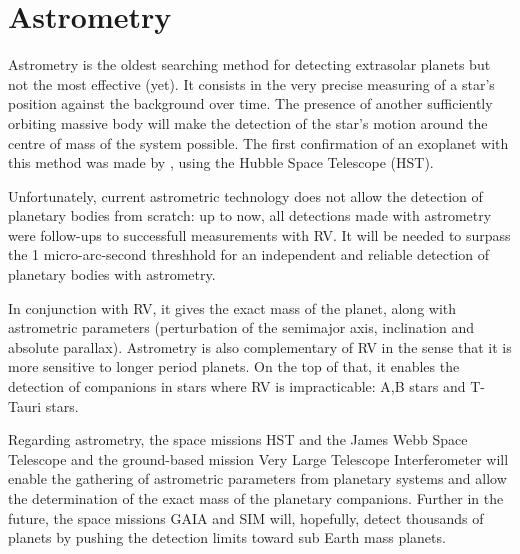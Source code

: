 \documentclass[dvips,12pt,a4paper]{report}
\begin{document}
\section{Astrometry}
\label{astrometry}
Astrometry is the oldest searching method for detecting extrasolar planets but not the most effective (yet). It consists in the very precise measuring of a star's position against the background over time. The presence of another sufficiently orbiting massive body will make the detection of the star's motion around the centre of mass of the system possible. The first confirmation of an exoplanet with this method was made by \citet{Benedict-2002}, using the Hubble Space Telescope (HST).

Unfortunately, current astrometric technology does not allow the detection of planetary bodies from scratch: up to now, all detections made with astrometry were follow-ups to successfull measurements with RV. It will be needed to surpass the 1 micro-arc-second threshhold for an independent and reliable detection of planetary bodies with astrometry.

In conjunction with RV, it gives the exact mass of the planet, along with astrometric parameters (perturbation of the semimajor axis, inclination and absolute parallax). Astrometry is also complementary of RV in the sense that it is more sensitive to longer period planets. On the top of that, it enables the detection of companions in stars where RV is impracticable: A,B stars and T-Tauri stars.

Regarding astrometry, the space missions HST and the James Webb Space Telescope and the ground-based mission Very Large Telescope Interferometer will enable the gathering of astrometric parameters from planetary systems and allow the determination of the exact mass of the planetary companions. Further in the future, the space missions GAIA and SIM will, hopefully, detect thousands of planets by pushing the detection limits toward sub Earth mass planets.
\end{document}
